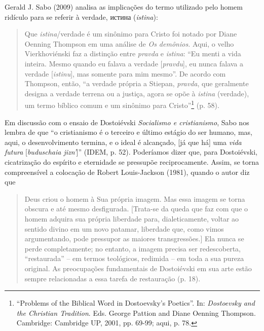 Gerald J. Sabo (2009) analisa as implicações do termo utilizado pelo
homem ridículo para se referir à verdade,
истина
(\emph{istina}):

\begin{quote}
Que \emph{istina}/verdade é um sinônimo para Cristo foi notado por Diane
Oenning Thompson em uma análise de \emph{Os demônios.} Aqui, o velho
Vierkhoviénski faz a distinção entre \emph{pravda} e \emph{istina}: ``Eu
menti a vida inteira. Mesmo quando eu falava a verdade
[\emph{pravdu}], eu nunca falava a verdade [\emph{istinu}], mas
somente para mim mesmo''. De acordo com Thompson, então, ``a verdade
própria a Stiepan, \emph{pravda}, que geralmente designa a verdade
terrena ou a justiça, agora se opõe à \emph{istina} (verdade), um termo
bíblico comum e um sinônimo para Cristo''\footnote{``Problems of the
  Biblical Word in Dostoevsky's Poetics''. In: \emph{Dostoevsky and the
  Christian Tradition}. Eds. George Pattion and Diane Oenning Thompson.
  Cambridge: Cambridge UP, 2001, pp. 69-99; aqui, p. 78.} (p. 58).
\end{quote}

Em discussão com o ensaio de Dostoiévski \emph{Socialismo e
cristianismo}, Sabo nos lembra de que ``o cristianismo é o terceiro e
último estágio do ser humano, mas, aqui, o desenvolvimento termina, e o
ideal é alcançado, {[}já que há{]} uma \emph{vida futura}
{[}\emph{buduschaia jizn'}{]}'' (IDEM, p. 52). Poderíamos dizer que,
para Dostoiévski, cicatrização do espírito e eternidade se pressupõe
reciprocamente. Assim, se torna compreensível a colocação de Robert
Louis-Jackson (1981), quando o autor diz que

\begin{quote}
Deus criou o homem à Sua própria imagem. Mas essa imagem se torna
obscura e até mesmo desfigurada. {[}Trata-se da queda que faz com que o
homem adquira sua própria liberdade para, dialeticamente, voltar ao
sentido divino em um novo patamar, liberdade que, como vimos
argumentando, pode pressupor as maiores transgressões.{]} Ela nunca se
perde completamente; no entanto, a imagem precisa ser redescoberta,
``restaurada'' -- em termos teológicos, redimida -- em toda a sua pureza
original. As preocupações fundamentais de Dostoiévski em sua arte estão
sempre relacionadas a essa tarefa de restauração (p. 18).
\end{quote}

